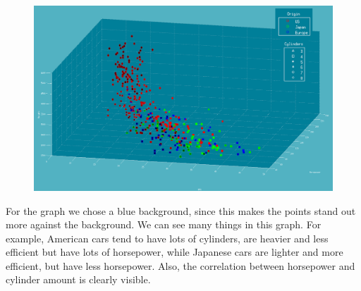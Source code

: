 \documentclass{article}
\begin{document}
\begin{figure}
	\includegraphics[width=\linewidth]{scivis_plot}
\end{figure}

For the graph we chose a blue background, since this makes the points stand out
more against the background.
We can see many things in this graph. For example, American cars tend to have
lots of cylinders, are heavier and less efficient but have lots of horsepower,
while Japanese cars are lighter and more efficient, but have less horsepower.
Also, the correlation between horsepower and cylinder amount is clearly
visible.
\end{document}
